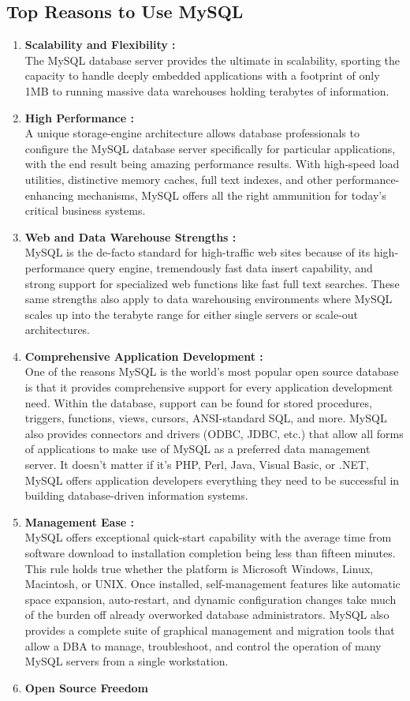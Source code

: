 \subsection{Top Reasons to Use MySQL}
\begin{enumerate}
\item \textbf{Scalability and Flexibility :} \\
The MySQL database server provides the ultimate in scalability, sporting the capacity to handle deeply embedded applications with a footprint of only 1MB to running massive data warehouses holding terabytes of information.

\item \textbf{High Performance :} \\
A unique storage-engine architecture allows database professionals to configure the MySQL database server specifically for particular applications, with the end result being amazing performance results. With high-speed load utilities, distinctive memory caches, full text indexes, and other performance-enhancing mechanisms, MySQL offers all the right ammunition for today's critical business systems.

\item \textbf{Web and Data Warehouse Strengths :} \\
MySQL is the de-facto standard for high-traffic web sites because of its high-performance query engine, tremendously fast data insert capability, and strong support for specialized web functions like fast full text searches. These same strengths also apply to data warehousing environments where MySQL scales up into the terabyte range for either single servers or scale-out architectures. 

\item \textbf{Comprehensive Application Development :} \\
One of the reasons MySQL is the world's most popular open source database is that it provides comprehensive support for every application development need. Within the database, support can be found for stored procedures, triggers, functions, views, cursors, ANSI-standard SQL, and more. MySQL also provides connectors and drivers (ODBC, JDBC, etc.) that allow all forms of applications to make use of MySQL as a preferred data management server. It doesn't matter if it's PHP, Perl, Java, Visual Basic, or .NET, MySQL offers application developers everything they need to be successful in building database-driven information systems.

\item \textbf{Management Ease :} \\
MySQL offers exceptional quick-start capability with the average time from software download to installation completion being less than fifteen minutes. This rule holds true whether the platform is Microsoft Windows, Linux, Macintosh, or UNIX. Once installed, self-management features like automatic space expansion, auto-restart, and dynamic configuration changes take much of the burden off already overworked database administrators. MySQL also provides a complete suite of graphical management and migration tools that allow a DBA to manage, troubleshoot, and control the operation of many MySQL servers from a single workstation. 

\item \textbf{Open Source Freedom}
\end{enumerate}
